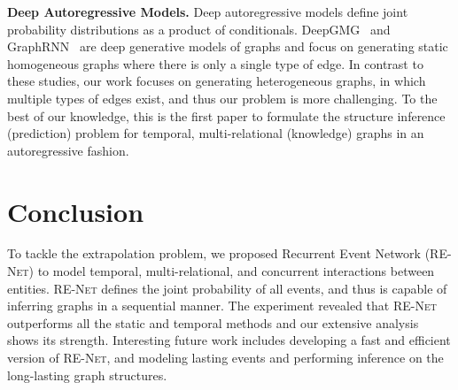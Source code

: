 \documentclass[11pt,a4paper]{article}
\newcommand{\method}{\textsc{RE-Net}\xspace}
\newcommand{\para}[1]{\smallskip\noindent\textbf{#1}}
\begin{document}
\para{Deep Autoregressive Models.} 
Deep autoregressive models define joint probability distributions as a product of conditionals. DeepGMG~\citep{li2018learning} and GraphRNN~\citep{you2018graphrnn} are deep generative models of graphs and focus on generating static homogeneous graphs where there is only a single type of edge. In contrast to these studies, our work focuses on generating heterogeneous graphs, in which multiple types of edges exist, and thus our problem is more challenging. 
To the best of our knowledge, this is the first paper to formulate the structure inference (prediction) problem for temporal, multi-relational (knowledge) graphs in an autoregressive fashion. 




\section{Conclusion}


To tackle the extrapolation problem, we proposed Recurrent Event Network (\method) to model temporal, multi-relational, and concurrent interactions between entities. 
\method defines the joint probability of all events, and thus is capable of inferring graphs in a sequential manner.
The experiment revealed that \method outperforms all the static and temporal methods and our extensive analysis shows its strength.
Interesting future work includes developing a fast and efficient version of \method, and modeling lasting events and performing inference on the long-lasting graph structures.



\end{document}
